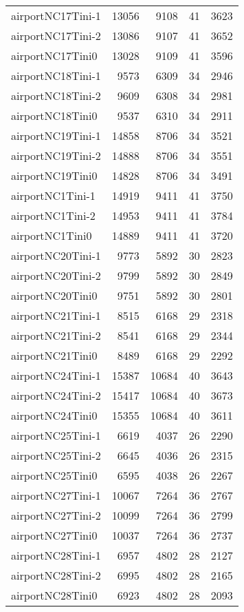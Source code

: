 \begin{tabular}{lrrrr}
airportNC17Tini-1 & 13056 & 9108 & 41 & 3623 \\
airportNC17Tini-2 & 13086 & 9107 & 41 & 3652 \\
airportNC17Tini0 & 13028 & 9109 & 41 & 3596 \\
airportNC18Tini-1 & 9573 & 6309 & 34 & 2946 \\
airportNC18Tini-2 & 9609 & 6308 & 34 & 2981 \\
airportNC18Tini0 & 9537 & 6310 & 34 & 2911 \\
airportNC19Tini-1 & 14858 & 8706 & 34 & 3521 \\
airportNC19Tini-2 & 14888 & 8706 & 34 & 3551 \\
airportNC19Tini0 & 14828 & 8706 & 34 & 3491 \\
airportNC1Tini-1 & 14919 & 9411 & 41 & 3750 \\
airportNC1Tini-2 & 14953 & 9411 & 41 & 3784 \\
airportNC1Tini0 & 14889 & 9411 & 41 & 3720 \\
airportNC20Tini-1 & 9773 & 5892 & 30 & 2823 \\
airportNC20Tini-2 & 9799 & 5892 & 30 & 2849 \\
airportNC20Tini0 & 9751 & 5892 & 30 & 2801 \\
airportNC21Tini-1 & 8515 & 6168 & 29 & 2318 \\
airportNC21Tini-2 & 8541 & 6168 & 29 & 2344 \\
airportNC21Tini0 & 8489 & 6168 & 29 & 2292 \\
airportNC24Tini-1 & 15387 & 10684 & 40 & 3643 \\
airportNC24Tini-2 & 15417 & 10684 & 40 & 3673 \\
airportNC24Tini0 & 15355 & 10684 & 40 & 3611 \\
airportNC25Tini-1 & 6619 & 4037 & 26 & 2290 \\
airportNC25Tini-2 & 6645 & 4036 & 26 & 2315 \\
airportNC25Tini0 & 6595 & 4038 & 26 & 2267 \\
airportNC27Tini-1 & 10067 & 7264 & 36 & 2767 \\
airportNC27Tini-2 & 10099 & 7264 & 36 & 2799 \\
airportNC27Tini0 & 10037 & 7264 & 36 & 2737 \\
airportNC28Tini-1 & 6957 & 4802 & 28 & 2127 \\
airportNC28Tini-2 & 6995 & 4802 & 28 & 2165 \\
airportNC28Tini0 & 6923 & 4802 & 28 & 2093 \\

\end{tabular}
